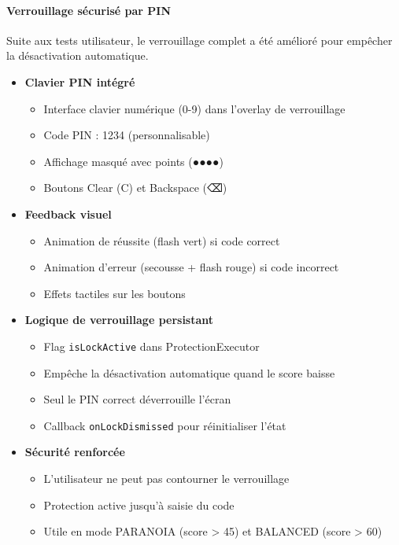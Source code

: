 \documentclass[11pt,a4paper]{article}
\begin{document}
\paragraph{Verrouillage sécurisé par PIN}
Suite aux tests utilisateur, le verrouillage complet a été amélioré pour empêcher la désactivation automatique.

\begin{itemize}
    \item \textbf{Clavier PIN intégré}
    \begin{itemize}
        \item Interface clavier numérique (0-9) dans l'overlay de verrouillage
        \item Code PIN : 1234 (personnalisable)
        \item Affichage masqué avec points (●●●●)
        \item Boutons Clear (C) et Backspace (⌫)
    \end{itemize}
    
    \item \textbf{Feedback visuel}
    \begin{itemize}
        \item Animation de réussite (flash vert) si code correct
        \item Animation d'erreur (secousse + flash rouge) si code incorrect
        \item Effets tactiles sur les boutons
    \end{itemize}
    
    \item \textbf{Logique de verrouillage persistant}
    \begin{itemize}
        \item Flag \texttt{isLockActive} dans ProtectionExecutor
        \item Empêche la désactivation automatique quand le score baisse
        \item Seul le PIN correct déverrouille l'écran
        \item Callback \texttt{onLockDismissed} pour réinitialiser l'état
    \end{itemize}
    
    \item \textbf{Sécurité renforcée}
    \begin{itemize}
        \item L'utilisateur ne peut pas contourner le verrouillage
        \item Protection active jusqu'à saisie du code
        \item Utile en mode PARANOIA (score > 45) et BALANCED (score > 60)
    \end{itemize}
\end{itemize}
\end{document}
